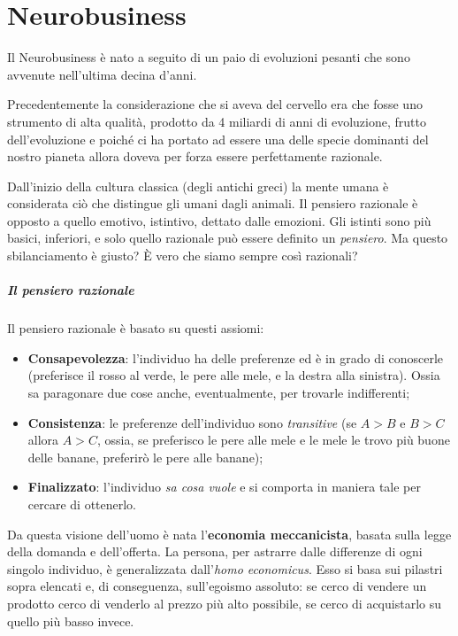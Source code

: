 \chapter{Neurobusiness}

Il Neurobusiness è nato a seguito di un paio di evoluzioni pesanti che sono
avvenute nell'ultima decina d'anni.

Precedentemente la considerazione che si aveva del cervello era che fosse uno
strumento di alta qualità, prodotto da 4 miliardi di anni di evoluzione, frutto
dell'evoluzione e poiché ci ha portato ad essere una delle specie dominanti del
nostro pianeta allora doveva per forza essere perfettamente razionale.

Dall'inizio della cultura classica (degli antichi greci) la mente umana è
considerata ciò che distingue gli umani dagli animali. Il pensiero razionale è
opposto a quello emotivo, istintivo, dettato dalle emozioni. Gli istinti sono
più basici, inferiori, e solo quello razionale può essere definito un
\textit{pensiero}. Ma questo sbilanciamento è giusto? È vero che siamo
sempre così razionali?

\paragraph*{Il pensiero razionale} Il pensiero razionale è basato su questi
assiomi:
\begin{itemize}
 \item \textbf{Consapevolezza}: l'individuo ha delle preferenze ed è in grado
 di conoscerle (preferisce il rosso al verde, le pere alle mele, e la destra
 alla sinistra). Ossia sa paragonare due cose anche, eventualmente, per
 trovarle indifferenti;
 \item \textbf{Consistenza}: le preferenze dell'individuo sono \emph{transitive}
 (se $A > B$ e $B > C$ allora $A > C$, ossia, se preferisco le pere alle mele e
 le mele le trovo più buone delle banane, preferirò le pere alle banane);
 \item \textbf{Finalizzato}: l'individuo \emph{sa cosa vuole} e si comporta in
 maniera tale per cercare di ottenerlo.
\end{itemize}
Da questa visione dell'uomo è nata l'\textbf{economia meccanicista}, basata
sulla legge della domanda e dell'offerta. La persona, per astrarre dalle
differenze di ogni singolo individuo, è generalizzata dall'\textit{homo
economicus}. Esso si basa sui pilastri sopra elencati e, di conseguenza,
sull'egoismo assoluto: se cerco di vendere un prodotto cerco di venderlo al
prezzo più alto possibile, se cerco di acquistarlo su quello più basso invece.

